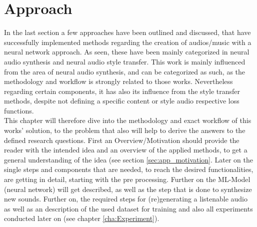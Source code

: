 \chapter{Approach}
\label{cha:Approach}
In the last section a few approaches have been outlined and discussed, that have successfully implemented methods regarding the creation of audios/music with a neural network approach. As seen, these have been mainly categorized in neural audio synthesis and neural audio style transfer. This work is mainly influenced from the area of neural audio synthesis, and can be categorized as such, as the methodology and workflow is strongly related to those works. Nevertheless regarding certain components, it has also its influence from the style transfer methods, despite not defining a specific content or style audio respective loss functions.\\

This chapter will therefore dive into the methodology and exact workflow of this works' solution, to the problem that also will help to derive the answers to the defined research questions. First an Overview/Motivation should provide the reader with the intended idea and an overview of the applied methods, to get a general understanding of the idea (see section \ref{sec:app_motivation}. Later on the single steps and components that are needed, to reach the desired functionalities, are getting in detail, starting with the pre processing. Further on the ML-Model (neural network) will get described, as well as the step that is done to synthesize new sounds. Further on, the required steps for (re)generating a listenable audio as well as an description of the used dataset for training and also all experiments conducted later on (see chapter \ref{cha:Experiment}).

